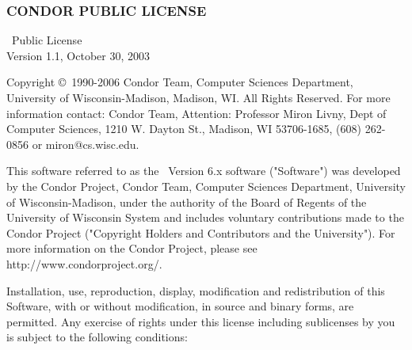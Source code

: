 \subsubsection*{\label{sec:condor-public-license}CONDOR PUBLIC LICENSE}

\begin{flushleft}
\CondorR\ Public License \\
Version 1.1, October 30, 2003
\end{flushleft}

Copyright \copyright\ 1990-2006 Condor Team, Computer Sciences Department,
University of Wisconsin-Madison, Madison, WI. All Rights Reserved.  For
more information contact: Condor Team, Attention: Professor Miron Livny,
Dept of Computer Sciences, 1210 W. Dayton St., Madison, WI 53706-1685, (608)
262-0856 or miron@cs.wisc.edu. 

This software referred to as the \CondorR\ Version 6.x software
("Software") was developed by the Condor Project, Condor Team,
Computer Sciences Department, University of Wisconsin-Madison, under
the authority of the Board of Regents of the  University of Wisconsin
System and includes voluntary contributions made to the Condor Project
("Copyright Holders and Contributors and the University").  For more
information on the Condor Project, please see
http://www.condorproject.org/.

Installation, use, reproduction, display, modification and
redistribution of this Software, with or without modification,  in
source and binary forms, are permitted.  Any exercise of rights under
this license including sublicenses by you is subject to the following
conditions:

